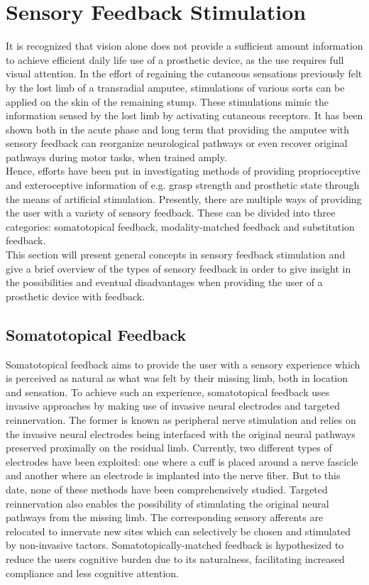 \section{Sensory Feedback Stimulation} \label{SFS}

It is recognized that vision alone does not provide a sufficient amount information to achieve efficient daily life use of a prosthetic device, as the use requires full visual attention. In the effort of regaining the cutaneous sensations previously felt by the lost limb of a transradial amputee, stimulations of various sorts can be applied on the skin of the remaining stump. These stimulations mimic the information sensed by the lost limb by activating cutaneous receptors. It has been shown both in the acute phase and long term that providing the amputee with sensory feedback can reorganize neurological pathways or even recover original pathways during motor tasks, when trained amply. \cite{Pino2009} \\
Hence, efforts have been put in investigating methods of providing proprioceptive and exteroceptive information of e.g. grasp strength and prosthetic state through the means of artificial stimulation. \cite{Schofield2014,Stephens-Fripp2018} Presently, there are multiple ways of providing the user with a variety of sensory feedback. These can be divided into three categories: somatotopical feedback, modality-matched feedback and substitution feedback. \cite{Schofield2014} \\
This section will present general concepts in sensory feedback stimulation and give a brief overview of the types of sensory feedback in order to give insight in the possibilities and eventual disadvantages when providing the user of a prosthetic device with feedback.

\subsection{Somatotopical Feedback}

Somatotopical feedback aims to provide the user with a sensory experience which is perceived as natural as what was felt by their missing limb, both in location and sensation. To achieve such an experience, somatotopical feedback uses invasive approaches by making use of invasive neural electrodes and targeted reinnervation. The former is known as peripheral nerve stimulation and relies on the invasive neural electrodes being interfaced with the original neural pathways preserved proximally on the residual limb. Currently, two different types of electrodes have been exploited: one where a cuff is placed around a nerve fascicle and another where an electrode is implanted into the nerve fiber. But to this date, none of these methods have been comprehensively studied. Targeted reinnervation also enables the possibility of stimulating the original neural pathways from the missing limb. The corresponding sensory afferents are relocated to innervate new sites which can selectively be chosen and stimulated by non-invasive tactors. Somatotopically-matched feedback is hypothesized to reduce the users cognitive burden due to its naturalness, facilitating increased compliance and less cognitive attention. \cite{Schofield2014}  

